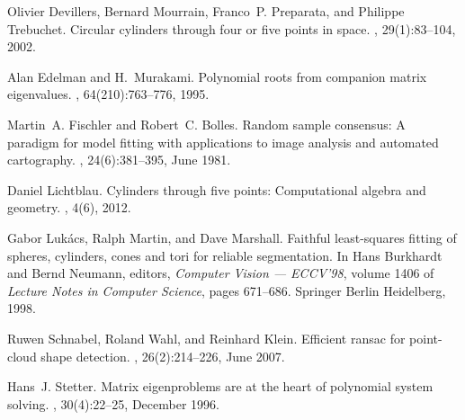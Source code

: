 \documentclass[5p]{elsarticle}
\begin{document}
\begin{thebibliography}{10}
Olivier Devillers, Bernard Mourrain, Franco~P. Preparata, and Philippe
  Trebuchet.
\newblock Circular cylinders through four or five points in space.
, 29(1):83--104, 2002.

Alan Edelman and H.~Murakami.
\newblock Polynomial roots from companion matrix eigenvalues.
, 64(210):763--776, 1995.

Martin~A. Fischler and Robert~C. Bolles.
\newblock Random sample consensus: A paradigm for model fitting with
  applications to image analysis and automated cartography.
, 24(6):381--395, June 1981.

Daniel Lichtblau.
\newblock Cylinders through five points: Computational algebra and geometry.
, 4(6), 2012.

Gabor Luk{\'a}cs, Ralph Martin, and Dave Marshall.
\newblock Faithful least-squares fitting of spheres, cylinders, cones and tori
  for reliable segmentation.
\newblock In Hans Burkhardt and Bernd Neumann, editors, {\em Computer Vision
  --- ECCV'98}, volume 1406 of {\em Lecture Notes in Computer Science}, pages
  671--686. Springer Berlin Heidelberg, 1998.

Ruwen Schnabel, Roland Wahl, and Reinhard Klein.
\newblock Efficient ransac for point-cloud shape detection.
, 26(2):214--226, June 2007.

Hans~J. Stetter.
\newblock Matrix eigenproblems are at the heart of polynomial system solving.
, 30(4):22--25, December 1996.

\end{thebibliography}
\end{document}
